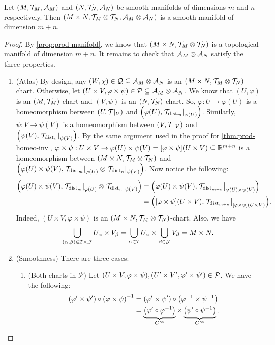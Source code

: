 \documentclass[11pt,reqno]{amsart}
\renewcommand{\phi}{\varphi}
\begin{document}
\begin{Thm}\label{thm:prod-smooth-manifold}
Let $(M,\mathcal{T}_M,\mathcal{A}_M)$ and $(N,\mathcal{T}_N,\mathcal{A}_N)$ be smooth manifolds
of dimensions $m$ and $n$ respectively.
Then $(M\times N,\mathcal{T}_M\otimes\mathcal{T}_N,\mathcal{A}_M\otimes\mathcal{A}_N)$ is a
smooth manifold of dimension $m+n$.
\end{Thm}
\begin{proof}
By \ref{prop:prod-manifold}, we know that $(M\times N,\mathcal{T}_M\otimes\mathcal{T}_N)$ is a
topological manifold of dimension $m+n$. It remains to check that
$\mathcal{A}_M\otimes\mathcal{A}_N$ satisfy the three properties.

\begin{enumerate}
\item (Atlas)
By design, any $(W,\chi)\in\mathcal Q\subseteq \mathcal{A}_M\otimes\mathcal{A}_N$
is an $(M\times N,\mathcal{T}_M\otimes\mathcal{T}_N)$-chart.
Otherwise, let $(U\times V,\phi\times\psi)\in\mathcal P
\subseteq\A_M\otimes\A_N$.
We know that $(U,\phi)$ is an $(M,\mathcal{T}_M)$-chart and
$(V,\psi)$ is an $(N,\mathcal{T}_N)$-chart.
So, $\phi:U\to\phi(U)$ is a homeomorphism between $(U,\mathcal{T}|_U)$ and
$\Br{\phi(U),\eval{\T_{\dist_m}}_{\phi(U)}}$.
Similarly, $\psi:V\to\psi(V)$ is a homeomorphism between $(V,\mathcal{T}|_V)$ and
$\Br{\psi(V),\eval{\T_{\dist_n}}_{\psi(V)}}$.
By the same argument used in the proof for \ref{thm:prod-homeo-inv},
$\phi\times\psi:U\times V\to\phi(U)\times\psi(V)=
\FUNC{\phi\times\psi}{U\times V}\subseteq\R^{m+n}$ is a homeomorphism
between $(M\times N,\mathcal{T}_M\otimes\mathcal{T}_N)$ and
$\Br{\phi(U)\times\psi(V),
\eval{\T_{\dist_m}}_{\phi(U)}\otimes\eval{\T_{\dist_n}}_{\psi(V)}}$.
Now notice the following:
\[\begin{aligned}
\Br{\phi(U)\times\psi(V),
\eval{\T_{\dist_m}}_{\phi(U)}\otimes\eval{\T_{\dist_n}}_{\psi(V)}}
&=
\Br{\phi(U)\times\psi(V),
\eval{\T_{\dist_{m+n}}}_{\phi(U)\times\psi(V)}}\\
&=
\Br{\FUNC{\phi\times\psi}{U\times V},
\eval{\T_{\dist_{m+n}}}_{\FUNC{\phi\times\psi}{U\times V}}}.\\
\end{aligned}\]
Indeed, $(U\times V,\phi\times\psi)$ is an
$\Br{M\times N,\T_M\otimes\T_N}$-chart.
Also, we have
\[
\bigcup_{(\alpha,\beta)\in\mathcal{I}\times\mathcal{J}}U_\alpha\times V_\beta
=
\bigcup_{\alpha\in\mathcal{I}}U_\alpha\times\bigcup_{\beta\in\mathcal{J}}V_\beta
=M\times N.
\]

\item (Smoothness)
There are three cases:
\begin{enumerate}
\item (Both charts in $\mathcal P$)
Let $(U\times V,\phi\times\psi),\Br{U'\times V',\phi'\times\psi'}
\in\mathcal P$.
We have the following:
\[\begin{aligned}
\Br{\phi'\times\psi'}\circ\Br{\phi\times\psi}\inv
&=\Br{\phi'\times\psi'}\circ\Br{\phi\inv\times\psi\inv}\\
&=\underbrace{\Br{\phi'\circ\phi\inv}}_{C^\infty}
\times\underbrace{\Br{\psi'\circ\psi\inv}}_{C^\infty}.\\
\end{aligned}\]


\end{enumerate}
\end{enumerate}
\end{proof}
\end{document}
